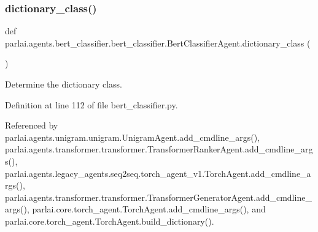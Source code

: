 \mbox{\label{classparlai_1_1agents_1_1bert__classifier_1_1bert__classifier_1_1BertClassifierAgent_af568b5ebe0ada0e2823e9e2be2d70e9f}} 
\subsubsection{\texorpdfstring{dictionary\+\_\+class()}{dictionary\_class()}}
{\footnotesize\ttfamily def parlai.\+agents.\+bert\+\_\+classifier.\+bert\+\_\+classifier.\+Bert\+Classifier\+Agent.\+dictionary\+\_\+class (\begin{DoxyParamCaption}{ }\end{DoxyParamCaption})\hspace{0.3cm}{\ttfamily [static]}}

\begin{DoxyVerb}Determine the dictionary class.\end{DoxyVerb}
 

Definition at line 112 of file bert\+\_\+classifier.\+py.



Referenced by parlai.\+agents.\+unigram.\+unigram.\+Unigram\+Agent.\+add\+\_\+cmdline\+\_\+args(), parlai.\+agents.\+transformer.\+transformer.\+Transformer\+Ranker\+Agent.\+add\+\_\+cmdline\+\_\+args(), parlai.\+agents.\+legacy\+\_\+agents.\+seq2seq.\+torch\+\_\+agent\+\_\+v1.\+Torch\+Agent.\+add\+\_\+cmdline\+\_\+args(), parlai.\+agents.\+transformer.\+transformer.\+Transformer\+Generator\+Agent.\+add\+\_\+cmdline\+\_\+args(), parlai.\+core.\+torch\+\_\+agent.\+Torch\+Agent.\+add\+\_\+cmdline\+\_\+args(), and parlai.\+core.\+torch\+\_\+agent.\+Torch\+Agent.\+build\+\_\+dictionary().

